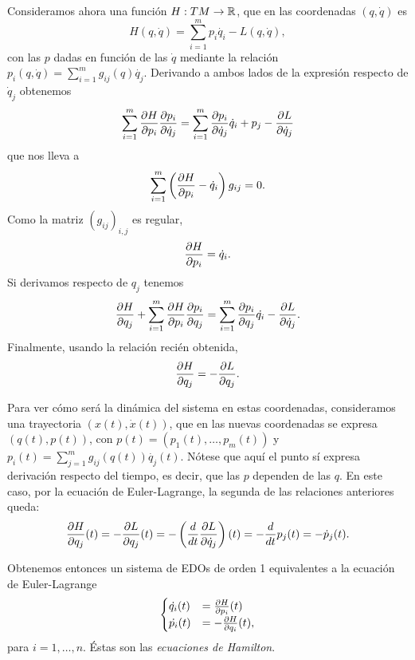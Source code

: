   Consideramos ahora una función $H:TM\rightarrow \mathbb{R}$, que en las coordenadas $(q,\dot{q})$ es 
  \begin{equation*}
    H(q,\dot{q})=\sum_{i=1}^m p_i \dot{q_i} - L(q,\dot{q}),
  \end{equation*}
  con las $p$ dadas en función de las $\dot{q}$ mediante la relación $p_i(q,\dot{q})=\sum_{i=1}^m g_{ij}(q) \dot{q_j}$. Derivando a ambos lados de la expresión respecto de $\dot{q}_j$ obtenemos
  \begin{equation*}
    \sum_{i=1}^m \frac{\partial H}{\partial p_i}\frac{\partial p_i}{\partial \dot{q}_j}=\sum_{i=1}^m \frac{\partial p_i}{\partial \dot{q}_j}\dot{q}_i + p_j - \frac{\partial L}{\partial \dot{q}_j}
  \end{equation*}
  que nos lleva a
  \begin{equation*}
    \sum_{i=1}^m \left( \frac{\partial H}{\partial p_i}-\dot{q}_i \right)g_{ij}=0.
  \end{equation*}
  Como la matriz $(g_{ij})_{i,j}$ es regular,
  \begin{equation*}
    \frac{\partial H}{\partial p_i}=\dot{q}_i.
  \end{equation*}
  Si derivamos respecto de $q_j$ tenemos
  \begin{equation*}
    \frac{\partial H}{\partial q_j}+\sum_{i=1}^m \frac{\partial H}{\partial p_i}\frac{\partial p_i}{\partial q_j}= \sum_{i=1}^m \frac{\partial p_i}{\partial q_j} \dot{q_i} - \frac{\partial L}{\partial \dot{q}_j}.
  \end{equation*}
  Finalmente, usando la relación recién obtenida,
  \begin{equation*}
    \frac{\partial H}{\partial q_j}=-\frac{\partial L}{\partial q_j}.
  \end{equation*}

  Para ver cómo será la dinámica del sistema en estas coordenadas, consideramos una trayectoria $(x(t),\dot{x}(t))$, que en las nuevas coordenadas se expresa $(q(t),p(t))$, con $p(t)=(p_1(t),\dots,p_m(t))$ y $p_i(t)=\sum_{j=1}^m g_{ij}(q(t)) \dot{q_j}(t)$. Nótese que aquí el punto sí expresa derivación respecto del tiempo, es decir, que las $p$ dependen de las $q$. En este caso, por la ecuación de Euler-Lagrange, la segunda de las relaciones anteriores queda:
  \begin{equation*}
    \frac{\partial H}{\partial q_j}(t)=-\frac{\partial L}{\partial q_j}(t)=-\left(\frac{d}{dt} \frac{\partial L}{\partial \dot{q}_j} \right)(t)= - \frac{d}{dt}p_j(t) = -\dot{p}_j(t).
  \end{equation*}
  
  Obtenemos entonces un sistema de EDOs de orden 1 equivalentes a la ecuación de Euler-Lagrange
  \begin{align}
    \begin{cases}
    \dot{q_i}(t)&=\frac{\partial H}{\partial p_i}(t) \\
      \dot{p_i}(t)&=-\frac{\partial H}{\partial q_i}(t),
    \end{cases}
    \label{hamilton}
  \end{align}
  para $i=1,\dots,n$. Éstas son las \emph{ecuaciones de Hamilton}.
  
